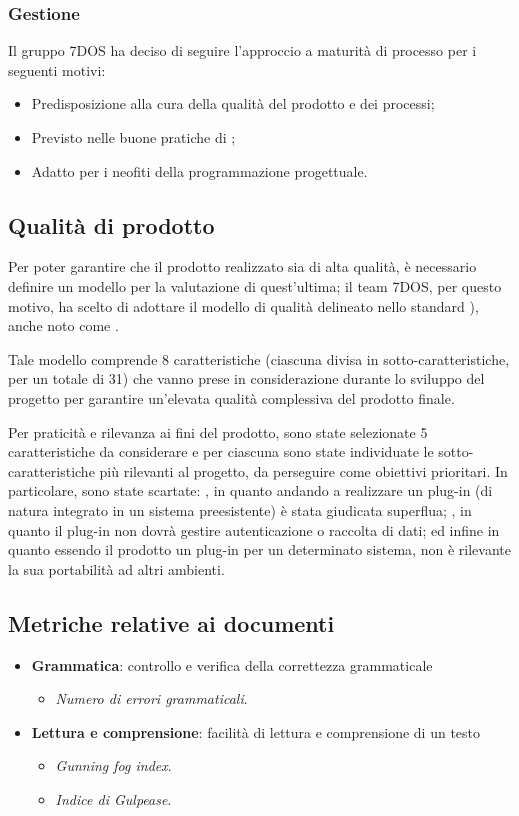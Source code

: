 \subsubsection{Gestione}
	Il gruppo 7DOS ha deciso di seguire l'approccio a maturità di processo per i seguenti motivi:
	\begin{itemize}
	\item Predisposizione alla cura della qualità del prodotto e dei processi;
	\item Previsto nelle buone pratiche di ;
	\item Adatto per i neofiti della programmazione progettuale.
	\end{itemize}
	
\subsection{Qualità di prodotto}
Per poter garantire che il prodotto realizzato sia di alta qualità, è necessario definire un modello per la valutazione di quest'ultima; il team 7DOS, per questo motivo, ha scelto di adottare il modello di qualità delineato nello standard ), anche noto come .

Tale modello comprende 8 caratteristiche (ciascuna divisa in sotto-caratteristiche, per un totale di 31) che vanno prese in considerazione durante lo sviluppo del progetto per garantire un'elevata qualità complessiva del prodotto finale.

Per praticità e rilevanza ai fini del prodotto, sono state selezionate 5 caratteristiche da considerare e per ciascuna sono state individuate le sotto-caratteristiche più rilevanti al progetto, da perseguire come obiettivi prioritari. In particolare, sono state scartate: , in quanto andando a realizzare un plug-in (di natura integrato in un sistema preesistente) è stata giudicata superflua; , in quanto il plug-in non dovrà gestire autenticazione o raccolta di dati; ed infine  in quanto essendo il prodotto un plug-in per un determinato sistema, non è rilevante la sua portabilità ad altri ambienti. 

\subsection{Metriche relative ai documenti}

\begin{itemize}
	\item{\textbf{Grammatica}: controllo e verifica della correttezza grammaticale
		\begin{itemize}
			\item{\emph{Numero di errori grammaticali}.}
		\end{itemize}	
	}
	\item{\textbf{Lettura e comprensione}: facilità di lettura e comprensione di un testo
		\begin{itemize}
			\item{\emph{Gunning fog index}.}
			\item{\emph{Indice di Gulpease}.}
		\end{itemize}	
	}
\end{itemize}

